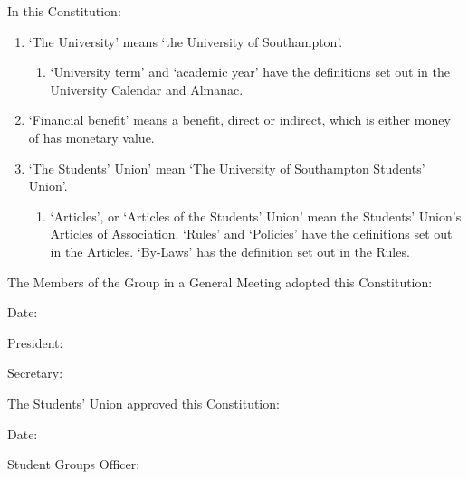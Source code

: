 \documentclass[12pt]{constitution}
\begin{document}
In this Constitution:
\begin{enumerate}
    \item `The University' means `the University of Southampton'.
    \begin{enumerate}
        \item `University term' and `academic year' have the definitions set out in the University Calendar and Almanac.
    \end{enumerate}

    \item `Financial benefit' means a benefit, direct or indirect, which is either money of has monetary value.
    \item `The Students' Union' mean `The University of Southampton Students' Union'.
    \begin{enumerate}
        \item `Articles', or `Articles of the Students' Union' mean the Students' Union's Articles of Association. `Rules' and `Policies' have the definitions set out in the Articles. `By-Laws' has the definition set out in the Rules.
    \end{enumerate}
\end{enumerate}


\label{article:declaration}

The Members of the Group in a General Meeting adopted this Constitution:

Date:

President:

Secretary:

The Students' Union approved this Constitution:

Date:

Student Groups Officer:
\end{document}

